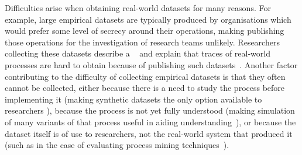 Difficulties arise when obtaining real-world datasets for many reasons. For
example, large empirical datasets are typically produced by organisations which
would prefer some level of secrecy around their operations, making publishing
those operations for the investigation of research teams unlikely. Researchers
collecting these datasets describe a ~\cite{bpi_ten_years_of_datasets} and explain that traces of real-world
processes are hard to obtain because  of publishing such
datasets~\cite{bpi_ten_years_of_datasets}. Another factor contributing to the
difficulty of collecting empirical datasets is that they often cannot be
collected, either because there is a need to study the process before
implementing it (making synthetic datasets the only option available to
researchers ), because
the process is not yet fully understood (making simulation of many variants of
that process useful in aiding understanding~), or because the dataset itself
is of use to researchers, not the real-world system that produced it (such as in
the case of evaluating process mining
techniques~\cite{van2004process,agrawal1998mining}). ~


